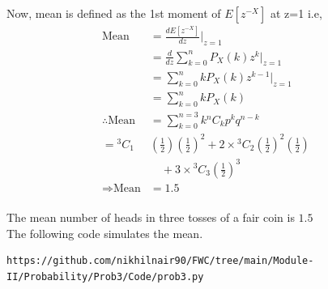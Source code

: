 \documentclass[journal,12pt,twocolumn]{IEEEtran}
\begin{document}
Now, mean is defined as the 1st moment of $E[z^{-X}]$ at z=1 i.e,
\begin{align}
\text{Mean}&= \frac{dE[z^{-X}]}{dz}|_{z=1}&
\\
&= \frac{d}{dz}\sum_{k=0}^{n} P_X(k) z^{k}|_{z=1}&
\\
&=\sum_{k=0}^{n} k P_X(k) z^{k-1}|_{z=1}&
\\
&= \sum_{k=0}^{n} k P_X(k)&
\\
\therefore \text{Mean} &= \sum_{k=0}^{n=3} k {}^nC_kp^{k}q^{n-k}&
\\
= {}^3C_1&\left(\frac{1}{2}\right)\left(\frac{1}{2}\right)^{2}+2\times{}^3C_2\left(\frac{1}{2}\right)^{2}\left(\frac{1}{2}\right)& \nonumber \\ 
& \quad+3\times{}^3C_3\left(\frac{1}{2}\right)^{3}&
\\
\Rightarrow\text{Mean} &= 1.5&
\end{align}
\\
The mean number of heads in three tosses of a fair coin is $1.5$
\\

The following code simulates the mean.

\begin{lstlisting}
https://github.com/nikhilnair90/FWC/tree/main/Module-II/Probability/Prob3/Code/prob3.py
\end{lstlisting}
\end{document}
